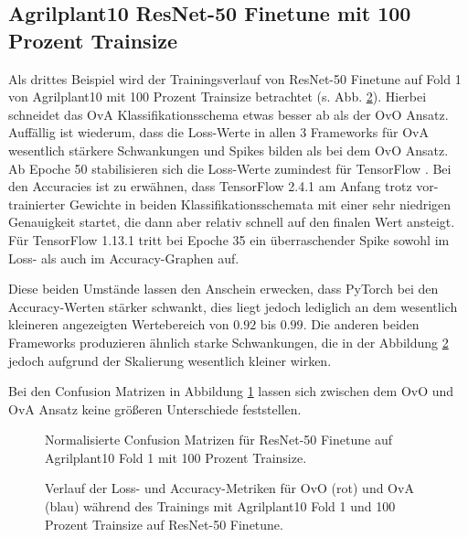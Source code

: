 \subsection{Agrilplant10 ResNet-50 Finetune mit 100 Prozent Trainsize}
\label{ch:BeispielC}
Als drittes Beispiel wird der Trainingsverlauf von ResNet-50 Finetune auf Fold 1 von Agrilplant10 mit 100 Prozent Trainsize betrachtet (s. Abb. \ref{fig:TrainingsverlaufC}).
Hierbei schneidet das OvA Klassifikationsschema etwas besser ab als der OvO Ansatz. Auffällig ist wiederum, dass die Loss-Werte in allen 3 Frameworks für OvA wesentlich stärkere Schwankungen und Spikes bilden als bei dem OvO Ansatz. Ab Epoche 50 stabilisieren sich die Loss-Werte zumindest für TensorFlow \cite{tensorflow}.
Bei den Accuracies ist zu erwähnen, dass TensorFlow 2.4.1 \cite{tensorflow} am Anfang trotz vor-trainierter Gewichte in beiden Klassifikationsschemata mit einer sehr niedrigen Genauigkeit startet, die dann aber relativ schnell auf den finalen Wert ansteigt. Für TensorFlow 1.13.1 \cite{tensorflow} tritt bei Epoche 35 ein überraschender Spike sowohl im Loss- als auch im Accuracy-Graphen auf.

Diese beiden Umstände lassen den Anschein erwecken, dass PyTorch \cite{pytorch} bei den Accuracy-Werten stärker schwankt, dies liegt jedoch lediglich an dem wesentlich kleineren angezeigten Wertebereich von $0.92$ bis $0.99$. Die anderen beiden Frameworks produzieren ähnlich starke Schwankungen, die in der Abbildung \ref{fig:TrainingsverlaufC} jedoch aufgrund der Skalierung wesentlich kleiner wirken.

Bei den Confusion Matrizen in Abbildung \ref{fig:ConfusionMatrixC} lassen sich zwischen dem OvO und OvA Ansatz keine größeren Unterschiede feststellen.

\begin{figure}[H]
\begin{adjustbox}{width=1.1\textwidth, center}

\end{adjustbox}
\caption{Normalisierte Confusion Matrizen für ResNet-50 Finetune auf Agrilplant10 Fold 1 mit 100 Prozent Trainsize.}
\label{fig:ConfusionMatrixC}
\end{figure}

\begin{figure}[H]
\begin{adjustbox}{width=1.4\textwidth, center}

\end{adjustbox}
\caption{Verlauf der Loss- und Accuracy-Metriken für OvO (rot) und OvA (blau) während des Trainings mit Agrilplant10 Fold 1 und 100 Prozent Trainsize auf ResNet-50 Finetune.}
\label{fig:TrainingsverlaufC}
\end{figure}
\newpage
